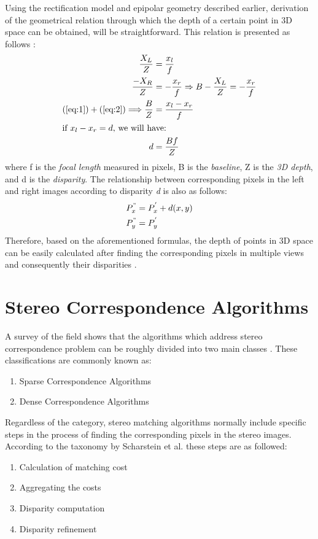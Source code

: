 Using the rectification model and epipolar geometry described earlier, 
derivation of the geometrical relation through which the depth of a certain point in 3D space 
can be obtained, will be straightforward. This relation is presented as follows \cite{sze11}:
\begin{align}
\frac{X_{L}}{Z} &= \frac{x_{l}}{f} \label{eq:1} \\
\frac{-X_{R}}{Z} &= -\frac{x_{r}}{f}  \Rightarrow B-\frac{X_{L}}{Z}=-\frac{x_{r}}{f} \label{eq:2} \\
(\ref{eq:1}) + (\ref{eq:2}) \Longrightarrow  \frac{B}{Z} &= \frac{x_{l}-x_{r}}{f} \label{eq:3} \\
\intertext{if $x_{l}-x_{r}=d$, we will have:}
d &= \frac{Bf}{Z} \label{eq:dispeq}
\end{align}
where f is the {\it focal length} measured in pixels, B is the {\it baseline}, Z is the {\it 3D depth}, and d is the {\it disparity}. The relationship between corresponding pixels in the left
and right images according to disparity {\it d} is also as follows:
\begin{align}
{P}^{"}_{x} &= {P}^{'}_{x}+d(x,y) \\
{P}^{"}_{y} &= {P}^{'}_{y}
\end{align}
Therefore, based on the aforementioned formulas, the depth of points in 3D space can be easily calculated after finding the corresponding pixels in multiple views and consequently their
disparities \cite{bol87,oku93,sch02}.

\section{Stereo Correspondence Algorithms}
A survey of the field shows that the algorithms which address stereo correspondence problem can be roughly divided into two main classes \cite{sch02}. These classifications are commonly known as:
\begin{enumerate}
\item Sparse Correspondence Algorithms
\item Dense Correspondence Algorithms 
\end{enumerate}

Regardless of the category, stereo matching algorithms normally include specific steps in the process of finding the corresponding pixels in the stereo images.
According to the taxonomy by Scharstein et al. these steps are as followed:

\begin{enumerate}
\item {Calculation of matching cost}
\item {Aggregating the costs}
\item {Disparity computation}
\item {Disparity refinement}
\end{enumerate}

